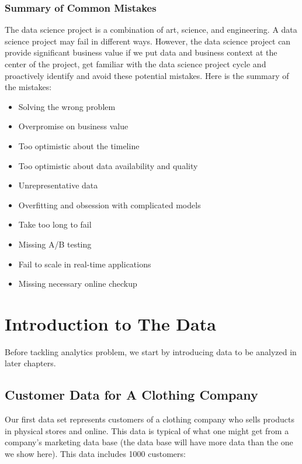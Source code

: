 \documentclass[
  12pt,
]{krantz}
\providecommand{\tightlist}{%
  \setlength{\itemsep}{0pt}\setlength{\parskip}{0pt}}
\begin{document}
\hypertarget{summary-of-common-mistakes}{%
\subsection{Summary of Common Mistakes}\label{summary-of-common-mistakes}}

The data science project is a combination of art, science, and engineering. A data science project may fail in different ways. However, the data science project can provide significant business value if we put data and business context at the center of the project, get familiar with the data science project cycle and proactively identify and avoid these potential mistakes. Here is the summary of the mistakes:

\begin{itemize}
\tightlist
\item
  Solving the wrong problem
\item
  Overpromise on business value
\item
  Too optimistic about the timeline
\item
  Too optimistic about data availability and quality
\item
  Unrepresentative data
\item
  Overfitting and obsession with complicated models
\item
  Take too long to fail
\item
  Missing A/B testing
\item
  Fail to scale in real-time applications
\item
  Missing necessary online checkup
\end{itemize}

\hypertarget{introduction-to-the-data}{%
\chapter{Introduction to The Data}\label{introduction-to-the-data}}

Before tackling analytics problem, we start by introducing data to be analyzed in later chapters.

\hypertarget{customer-data-for-a-clothing-company}{%
\section{Customer Data for A Clothing Company}\label{customer-data-for-a-clothing-company}}

Our first data set represents customers of a clothing company who sells products in physical stores and online. This data is typical of what one might get from a company's marketing data base (the data base will have more data than the one we show here). This data includes 1000 customers:
\end{document}
